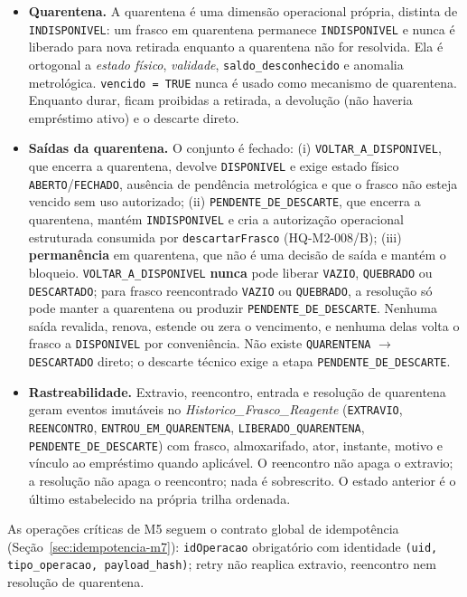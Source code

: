 \begin{regra}
\begin{itemize}
    \item \textbf{Quarentena.} A quarentena é uma dimensão operacional própria, distinta de \texttt{INDISPONIVEL}: um frasco em quarentena permanece \texttt{INDISPONIVEL} e nunca é liberado para nova retirada enquanto a quarentena não for resolvida. Ela é ortogonal a \textit{estado físico}, \textit{validade}, \texttt{saldo\_desconhecido} e anomalia metrológica. \texttt{vencido = TRUE} nunca é usado como mecanismo de quarentena. Enquanto durar, ficam proibidas a retirada, a devolução (não haveria empréstimo ativo) e o descarte direto.
    \item \textbf{Saídas da quarentena.} O conjunto é fechado: (i) \texttt{VOLTAR\_A\_DISPONIVEL}, que encerra a quarentena, devolve \texttt{DISPONIVEL} e exige estado físico \texttt{ABERTO}/\texttt{FECHADO}, ausência de pendência metrológica e que o frasco não esteja vencido sem uso autorizado; (ii) \texttt{PENDENTE\_DE\_DESCARTE}, que encerra a quarentena, mantém \texttt{INDISPONIVEL} e cria a autorização operacional estruturada consumida por \texttt{descartarFrasco} (HQ-M2-008/B); (iii) \textbf{permanência} em quarentena, que não é uma decisão de saída e mantém o bloqueio. \texttt{VOLTAR\_A\_DISPONIVEL} \textbf{nunca} pode liberar \texttt{VAZIO}, \texttt{QUEBRADO} ou \texttt{DESCARTADO}; para frasco reencontrado \texttt{VAZIO} ou \texttt{QUEBRADO}, a resolução só pode manter a quarentena ou produzir \texttt{PENDENTE\_DE\_DESCARTE}. Nenhuma saída revalida, renova, estende ou zera o vencimento, e nenhuma delas volta o frasco a \texttt{DISPONIVEL} por conveniência. Não existe \texttt{QUARENTENA} $\rightarrow$ \texttt{DESCARTADO} direto; o descarte técnico exige a etapa \texttt{PENDENTE\_DE\_DESCARTE}.
    \item \textbf{Rastreabilidade.} Extravio, reencontro, entrada e resolução de quarentena geram eventos imutáveis no \textit{Historico\_Frasco\_Reagente} (\texttt{EXTRAVIO}, \texttt{REENCONTRO}, \texttt{ENTROU\_EM\_QUARENTENA}, \texttt{LIBERADO\_QUARENTENA}, \texttt{PENDENTE\_DE\_DESCARTE}) com frasco, almoxarifado, ator, instante, motivo e vínculo ao empréstimo quando aplicável. O reencontro não apaga o extravio; a resolução não apaga o reencontro; nada é sobrescrito. O estado anterior é o último estabelecido na própria trilha ordenada.
\end{itemize}
As operações críticas de M5 seguem o contrato global de idempotência (Seção~\ref{sec:idempotencia-m7}): \texttt{idOperacao} obrigatório com identidade \texttt{(uid, tipo\_operacao, payload\_hash)}; retry não reaplica extravio, reencontro nem resolução de quarentena.
\end{regra}

